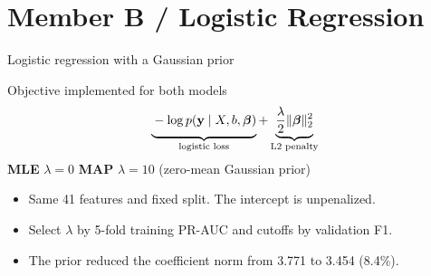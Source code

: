 \documentclass[10pt,aspectratio=169]{beamer}
\begin{document}
\begingroup
  \AtBeginSection[]{}
  \section{Member B / Logistic Regression}

\begin{frame}{Logistic regression with a Gaussian prior}
  \begin{block}{Objective implemented for both models}
    \[
      \underbrace{\vphantom{\frac{\lambda}{2}}-\log p(\mathbf y\mid X,b,\boldsymbol\beta)}_{\text{logistic loss}}
      + \underbrace{\frac{\lambda}{2}\lVert\boldsymbol\beta\rVert_2^2}_{\text{L2 penalty}}
    \]
    \centering
    \textbf{MLE} \(\lambda=0\) \qquad
    \textbf{MAP} \(\lambda=10\) \quad (zero-mean Gaussian prior)
    \vspace{0.3em}
  \end{block}
  \medskip
  \begin{itemize}
    \setlength{\itemsep}{0.4em}
    \item Same 41 features and fixed split. The intercept is unpenalized.
    \item Select \(\lambda\) by 5-fold training PR-AUC and cutoffs by validation F1.
    \item The prior reduced the coefficient norm from 3.771 to 3.454 (8.4\%).
  \end{itemize}
\end{frame}
\end{document}
